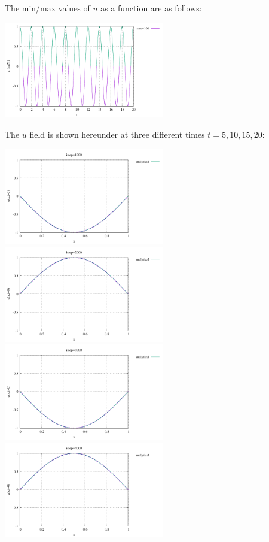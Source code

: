 The min/max values of $u$ as a function are as follows:
\begin{center}
\includegraphics[width=7cm]{python_codes/fieldstone_166/RESULTS/exp1/u_stats.pdf}
\end{center}

The $u$ field is shown hereunder at three different times $t=5,10,15,20$:
\begin{center}
\includegraphics[width=7cm]{python_codes/fieldstone_166/RESULTS/exp1/u_1000.pdf}
\includegraphics[width=7cm]{python_codes/fieldstone_166/RESULTS/exp1/u_2000.pdf}\\
\includegraphics[width=7cm]{python_codes/fieldstone_166/RESULTS/exp1/u_3000.pdf}
\includegraphics[width=7cm]{python_codes/fieldstone_166/RESULTS/exp1/u_4000.pdf}
\end{center}



